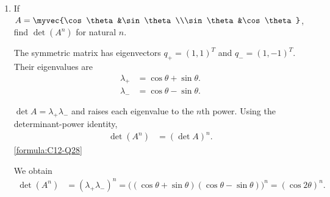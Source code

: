 \begin{enumerate}[label=\thesubsection.\arabic*, ref=\thesubsection.\theenumi]
    Differentiating once more,
    \begin{align*}
        y'' & =\frac1x-\frac b{a+bx}-\frac{ab}{(a+bx)^2}
        =\frac{a^2}{x(a+bx)^2}.
    \end{align*}

    The Euler combination simplifies without the logarithm:
    \begin{align*}
        xy'-y & =x\frac a{a+bx}=\frac{ax}{a+bx}.
    \end{align*}

    Squaring it and comparing with $y''$ gives
    \begin{align*}
        (xy'-y)^2 & =\frac{a^2x^2}{(a+bx)^2}=x^3\frac{a^2}{x(a+bx)^2}=x^3y''.
    \end{align*}

    Hence
    \begin{align*}
        x^3y'' & =(xy'-y)^2.
    \end{align*}


    \par
    \medskip
    \noindent\textbf{Matrices and determinants}
    \par
    \smallskip

    \item
    \label{question:C12-Q28}
    \label{question-short:C12-Q28} If $A=\myvec{\cos\theta&\sin\theta\\\sin\theta&\cos\theta}$, find $\det(A^n)$ for natural $n$.

    \par
    \smallskip
    \solution

    The symmetric matrix has eigenvectors $q_+=(1,1)^T$ and $q_-=(1,-1)^T$. Their eigenvalues are
    \begin{align*}
        \lambda_+ & =\cos\theta+\sin\theta. \\
        \lambda_- & =\cos\theta-\sin\theta.
    \end{align*}

    $\det A=\lambda_+\lambda_-$ and raises each eigenvalue to the $n$th power. Using the determinant-power identity,
    \begin{align*}
        \det(A^n) & =(\det A)^n.
    \end{align*}
    \hfill\eqref{formula:C12-Q28}

    \par
    We obtain
    \begin{align*}
        \det(A^n) & =(\lambda_+\lambda_-)^n
        =\bigl((\cos\theta+\sin\theta)(\cos\theta-\sin\theta)\bigr)^n
        =(\cos2\theta)^n.
    \end{align*}



\end{enumerate}
